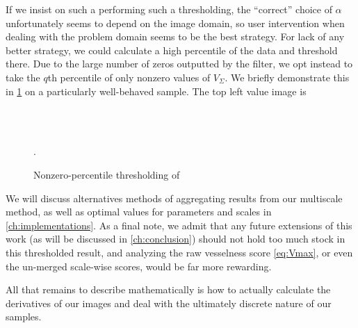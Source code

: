     If we insist on such a performing such a thresholding, the ``correct'' choice of $\alpha$ unfortunately seems to depend on the image domain, so user intervention when dealing with the problem domain seems to be the best strategy. For lack of any better strategy, we could calculate a high percentile of the data and threshold there. Due to the large number of zeros outputted by the filter, we opt instead to take the $q$th percentile of only nonzero values of $V_\Sigma$.
	We briefly demonstrate this in \cref{fig:qthresh_demo} on a particularly well-behaved sample. The top left value image is  
	
	\begin{figure} \centering
		 \\
		 \\
		\caption{Nonzero-percentile thresholding of \Vmax}.
		\label{fig:qthresh_demo}
	\end{figure}

	We will discuss alternatives methods of aggregating results from our multiscale method, as well as optimal values for parameters and scales
	in \cref{ch:implementations}. As a final note, we admit that any future extensions of this work (as will be discussed in \cref{ch:conclusion}) should not hold too much stock in this thresholded result, and analyzing the 
	raw vesselness score \cref{eq:Vmax}, or even
	the un-merged scale-wise scores, would be far more
	rewarding.    
	

All that remains to describe mathematically is how to actually calculate the derivatives of our images and deal with the ultimately discrete nature of our samples.    